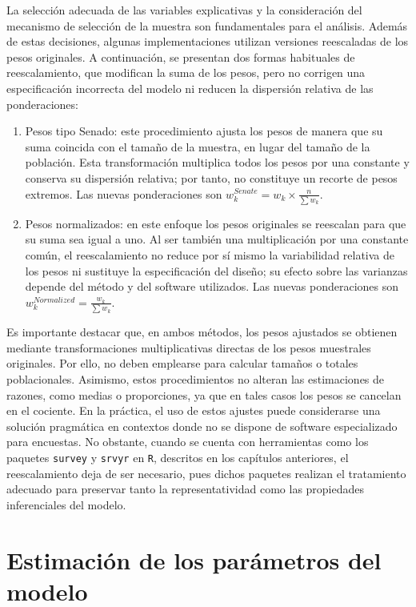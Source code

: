 \documentclass[
  spanish,
  11pt,
  letterpaper,
  oneside,
  open=any]{scrbook}
\begin{document}
La selección adecuada de las variables explicativas y la consideración
del mecanismo de selección de la muestra son fundamentales para el
análisis. Además de estas decisiones, algunas implementaciones utilizan
versiones reescaladas de los pesos originales. A continuación, se
presentan dos formas habituales de reescalamiento, que modifican la suma
de los pesos, pero no corrigen una especificación incorrecta del modelo
ni reducen la dispersión relativa de las ponderaciones:

\begin{enumerate}
\def\labelenumi{\arabic{enumi}.}
\item
  Pesos tipo Senado: este procedimiento ajusta los pesos de manera que
  su suma coincida con el tamaño de la muestra, en lugar del tamaño de
  la población. Esta transformación multiplica todos los pesos por una
  constante y conserva su dispersión relativa; por tanto, no constituye
  un recorte de pesos extremos. Las nuevas ponderaciones son
  \(w_k^{Senate} = w_k \times \frac{n}{\sum w_k}\).
\item
  Pesos normalizados: en este enfoque los pesos originales se reescalan
  para que su suma sea igual a uno. Al ser también una multiplicación
  por una constante común, el reescalamiento no reduce por sí mismo la
  variabilidad relativa de los pesos ni sustituye la especificación del
  diseño; su efecto sobre las varianzas depende del método y del
  software utilizados. Las nuevas ponderaciones son
  \(w_k^{Normalized} = \frac{w_k}{\sum w_k}\).
\end{enumerate}

Es importante destacar que, en ambos métodos, los pesos ajustados se
obtienen mediante transformaciones multiplicativas directas de los pesos
muestrales originales. Por ello, no deben emplearse para calcular
tamaños o totales poblacionales. Asimismo, estos procedimientos no
alteran las estimaciones de razones, como medias o proporciones, ya que
en tales casos los pesos se cancelan en el cociente. En la práctica, el
uso de estos ajustes puede considerarse una solución pragmática en
contextos donde no se dispone de software especializado para encuestas.
No obstante, cuando se cuenta con herramientas como los paquetes
\texttt{survey} y \texttt{srvyr} en \texttt{R}, descritos en los
capítulos anteriores, el reescalamiento deja de ser necesario, pues
dichos paquetes realizan el tratamiento adecuado para preservar tanto la
representatividad como las propiedades inferenciales del modelo.

\section{Estimación de los parámetros del
modelo}\label{estimacion-de-los-parametros-del-modelo}
\end{document}
